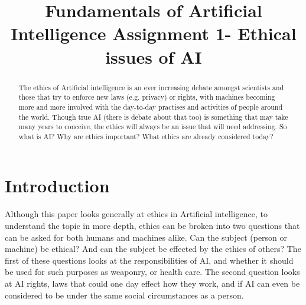 \documentclass[article]{IEEEtran}
\begin{document}
\title{Fundamentals of Artificial Intelligence Assignment 1- Ethical issues of AI}

\author{
}

\maketitle

\begin{abstract}
The ethics of Artificial intelligence is an ever increasing debate amongst scientists and those that try to enforce new laws (e.g. privacy) or rights, with machines becoming more and more involved with the day-to-day practises and activities of people around the world. Though true AI (there is debate about that too) is something that may take many years to conceive, the ethics will always be an issue that will need addressing. So what is AI? Why are ethics important? What ethics are already considered today?
\end{abstract}

\section{Introduction}
Although this paper looks generally at ethics in Artificial intelligence, to understand the topic in more depth, ethics can be broken into two questions that can be asked for both humans and machines alike. Can the subject (person or machine) be ethical? And can the subject be effected by the ethics of others? The first of these questions looks at the responsibilities of AI, and whether it should be used for such purposes as weaponry, or health care. The second question looks at AI rights, laws that could one day effect how they work, and if AI can even be considered to be under the same social circumstances as a person.
\end{document}
